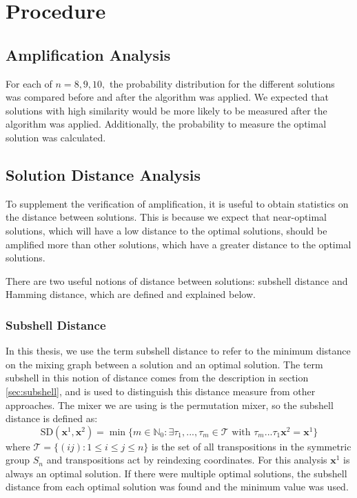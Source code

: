 \section{Procedure}
    \subsection{Amplification Analysis}
For each of $n=8,9,10,$ the probability distribution for the different solutions was compared before and after the algorithm was applied. We expected that solutions with high similarity would be more likely to be measured after the algorithm was applied. Additionally, the probability to measure the optimal solution was calculated.

    \subsection{Solution Distance Analysis}\label{sec:solution distance}
To supplement the verification of amplification, it is useful to obtain statistics on the distance between solutions. This is because we expect that near-optimal solutions, which will have a low distance to the optimal solutions, should be amplified more than other solutions, which have a greater distance to the optimal solutions.

There are two useful notions of distance between solutions: subshell distance and Hamming distance, which are defined and explained below.

    \subsubsection{Subshell Distance}
In this thesis, we use the term subshell distance to refer to the minimum distance on the mixing graph between a solution and an optimal solution. The term subshell in this notion of distance comes from the description in section \ref{sec:subshell}, and is used to distinguish this distance measure from other approaches. The mixer we are using is the permutation mixer, so the subshell distance is defined as:
$$\text{SD}(\mathbf{x}^1,\mathbf{x}^2)=\min \{m\in \mathbb{N}_0: \exists \tau_1,...,\tau_m \in \mathcal{T} \text{ with } \tau_m ... \tau_1 \mathbf{x}^2 = \mathbf{x}^1\}$$
where $\mathcal{T}=\{(ij):1 \leq i \leq j \leq n \}$ is the set of all transpositions in the symmetric group $S_n$ and transpositions act by reindexing coordinates. For this analysis $\mathbf{x}^1$ is always an optimal solution. If there were multiple optimal solutions, the subshell distance from each optimal solution was found and the minimum value was used.

